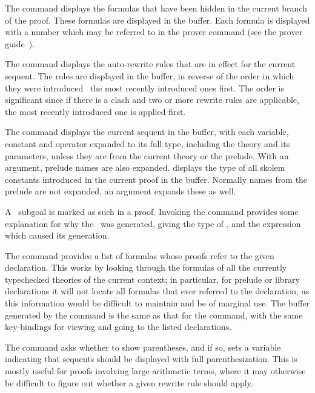 The  command displays the formulas that have
been hidden in the current branch of the proof.  These formulas are
displayed in the  buffer.  Each formula is displayed with a
number which may be referred to in the  prover command (see
the prover guide~\cite{PVS:prover}).

The  command displays the auto-rewrite rules that
are in effect for the current sequent.  The rules are displayed in the
 buffer, in reverse of the order in which they were
introduced \ie\ the most recently introduced ones first.  The order is
significant since if there is a clash and two or more rewrite rules are
applicable, the most recently introduced one is applied first.

The  command displays the current sequent in
the  buffer, with each variable, constant and
operator expanded to its full type, including the theory and its
parameters, unless they are from the current theory or the prelude.  With
an argument, prelude names are also expanded. 
displays the type of all skolem constants introduced in the current proof
in the  buffer.  Normally names from the prelude are
not expanded, an argument expands these as well.

A \tcc\ subgoal is marked as such in a proof. Invoking the
 command provides some explanation for why the \tcc\ was
generated, giving the type of \tcc, and the expression which caused its
generation.

The  command provides a list of formulas whose proofs
refer to the given declaration.  This works by looking through the
formulas of all the currently typechecked theories of the current context;
in particular, for prelude or library declarations it will not locate all
formulas that ever referred to the declaration, as this information would
be difficult to maintain and be of marginal use.  The buffer generated by
the  command is the same as that for the
 command, with the same key-bindings for viewing and
going to the listed declarations.

The  command asks whether to show parentheses,
and if so, sets a variable indicating that sequents should be displayed
with full parenthesization.  This is mostly useful for proofs involving
large arithmetic terms, where it may otherwise be difficult to figure out
whether a given rewrite rule should apply.

